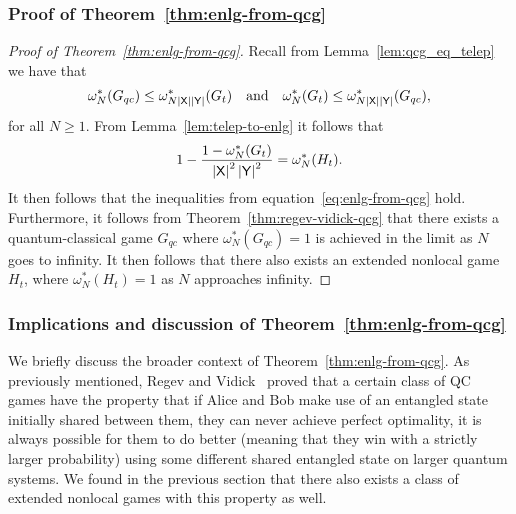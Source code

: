 \subsubsection*{Proof of Theorem~\ref{thm:enlg-from-qcg}}

\begin{proof}[Proof of Theorem~\ref{thm:enlg-from-qcg}]
	Recall from Lemma~\ref{lem:qcg_eq_telep} we have that 
	\begin{align}
		\omega_N^*(G_{qc}) \leq \omega_{N\left\lvert \mathsf{X} \right\rvert\left\lvert \mathsf{Y} \right\rvert}^*(G_t) \quad \textnormal{and} \quad \omega^*_{N}(G_t) \leq \omega^*_{N\left\lvert \mathsf{X} \right\rvert\left\lvert \mathsf{Y} \right\rvert}(G_{qc}),
	\end{align}		
	for all $N \geq 1$. From Lemma~\ref{lem:telep-to-enlg} it follows that 
	\begin{align}
		1 - \frac{1 - \omega_{N}^*(G_t)}{\left\lvert \mathsf{X} \right\rvert^2\left\lvert \mathsf{Y} \right\rvert^2} = \omega_N^*(H_t).
	\end{align}
	It then follows that the inequalities from equation~\eqref{eq:enlg-from-qcg} hold.
	Furthermore, it follows from Theorem~\ref{thm:regev-vidick-qcg} that there exists a quantum-classical game $G_{qc}$ where $\omega_N^*(G_{qc}) = 1$ is achieved in the limit as $N$ goes to infinity. It then follows that there also exists an extended nonlocal game $H_t$, where $\omega_N^*(H_t) = 1$ as $N$ approaches infinity. 
\end{proof}

\subsubsection*{Implications and discussion of Theorem~\ref{thm:enlg-from-qcg}}

We briefly discuss the broader context of Theorem~\ref{thm:enlg-from-qcg}. As previously mentioned, Regev and Vidick~\cite{Regev2013} proved that a certain class of QC games have the property that if Alice and Bob make use of an entangled state initially shared between them, they can never achieve perfect optimality, it is always possible for them to do better (meaning that they win with a strictly larger probability) using some different shared entangled state on larger quantum systems. We found in the previous section that there also exists a class of extended nonlocal games with this property as well. 
 
